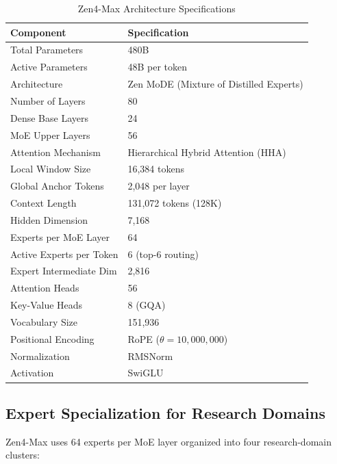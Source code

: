 \documentclass[11pt,a4paper]{article}
\begin{document}
\begin{table}[H]
\centering
\begin{tabular}{ll}
\toprule
\textbf{Component} & \textbf{Specification} \\
\midrule
Total Parameters          & 480B \\
Active Parameters         & 48B per token \\
Architecture              & Zen MoDE (Mixture of Distilled Experts) \\
Number of Layers          & 80 \\
Dense Base Layers         & 24 \\
MoE Upper Layers          & 56 \\
Attention Mechanism       & Hierarchical Hybrid Attention (HHA) \\
Local Window Size         & 16,384 tokens \\
Global Anchor Tokens      & 2,048 per layer \\
Context Length            & 131,072 tokens (128K) \\
Hidden Dimension          & 7,168 \\
Experts per MoE Layer     & 64 \\
Active Experts per Token  & 6 (top-6 routing) \\
Expert Intermediate Dim   & 2,816 \\
Attention Heads           & 56 \\
Key-Value Heads           & 8 (GQA) \\
Vocabulary Size           & 151,936 \\
Positional Encoding       & RoPE ($\theta = 10{,}000{,}000$) \\
Normalization             & RMSNorm \\
Activation                & SwiGLU \\
\bottomrule
\end{tabular}
\caption{Zen4-Max Architecture Specifications}
\end{table}

\subsection{Expert Specialization for Research Domains}

Zen4-Max uses 64 experts per MoE layer organized into four research-domain clusters:
\end{document}
